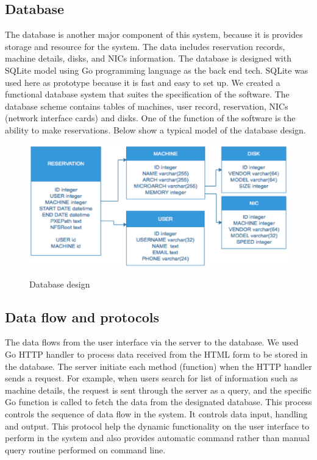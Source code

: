 \subsection{Database}
The database is another major component of this system, because it is provides storage and resource for the system. The data includes reservation records, machine details, disks, and NICs information. The database is designed with SQLite model using Go programming language as the back end tech. SQLite was used here as prototype because it is fast and easy to set up. We created a functional database system that suites the specification of the software. 
The database scheme contains tables of machines, user record, reservation, NICs (network interface cards) and disks.  One of the function of the software is the ability to make reservations.  Below show a typical model of the database design.
 \begin{figure}[h!]
\includegraphics[width = \linewidth]{database.eps}
\label{fig:Database Schema} 
\caption{Database design}
\end{figure}
\pagebreak
\subsection{Data flow and  protocols}
The data flows from the user interface via the server to the database. We used Go HTTP handler to process data received from the HTML form to be stored in the database. The server initiate each method (function) when the HTTP handler sends a request. For example, when users search for list of information such as machine details, the request is sent through the server as a query, and the specific Go function is called to fetch the data from the designated database. This process controls the sequence of data flow in the system. It controls data input, handling and output. This protocol help the dynamic functionality on the user interface to perform in the system and also provides automatic command rather than manual query routine performed on command line. 

